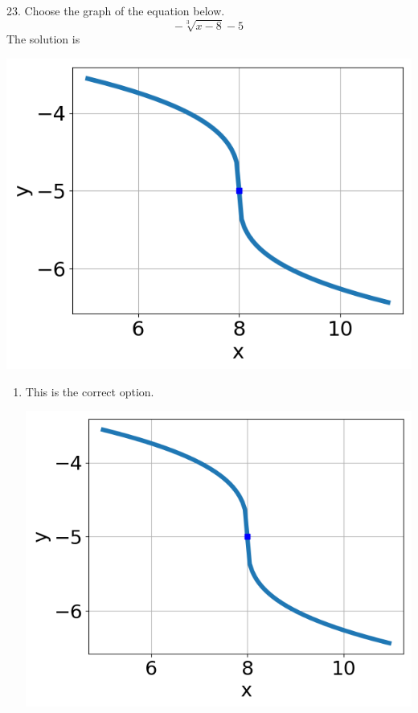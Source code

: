 \documentclass{article}[10pt]
\begin{document}
23. Choose the graph of the equation below.
$$ - \sqrt[3]{x - 8} - 5 $$ 
The solution is  
\begin{center}\includegraphics[scale=0.5]{../Figures/question23CD.png}\end{center}\begin{enumerate}[label=\Alph*.] 
\item This is the correct option. 
\begin{center}\includegraphics[scale=0.5]{../Figures/question23CD.png}\end{center} 
 

\end{enumerate}
\end{document}
